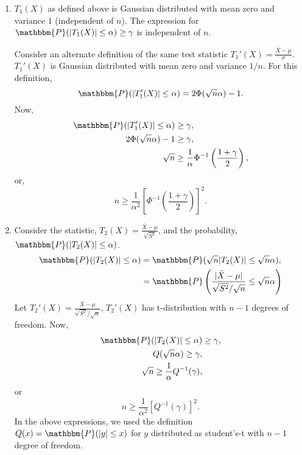 \documentclass[a4paper,english,12pt]{article}
\begin{document}
\begin{enumerate}[label=(\alph*).]
\item $T_1(X)$ as defined above is Gaussian distributed with mean zero and variance $1$ (independent of $n$). The expression for $\mathbbm{P}(|T_1(X)|\leq\alpha)\geq \gamma$ is independent of $n$. 
\par Consider an alternate definition of the same test statistic $T_1'(X)=\frac{\bar{X}-\mu}{\sigma}$. $T_1'(X)$ is Gaussian distributed with mean zero and variance $1/n$. For this definition,
\begin{equation*}
\mathbbm{P}(|T_1'(X)|\leq\alpha)=2\Phi(\sqrt{n}\alpha)-1.
\end{equation*}
Now,
\begin{align*}
\mathbbm{P}(|T_1'(X)|\leq\alpha)&\geq \gamma,\\
2\Phi(\sqrt{n}\alpha)-1&\geq \gamma,\\
\sqrt{n}&\geq \frac{1}{\alpha}\Phi^{-1}\left(\frac{1+\gamma}{2}\right),
\end{align*}
or,
\begin{equation*}
n\geq \frac{1}{\alpha^2}\left[\Phi^{-1}\left(\frac{1+\gamma}{2}\right)\right]^2.
\end{equation*}
\item Consider the statistic, $T_2(X)=\frac{\bar{X}-\mu}{\sqrt{S^2}}$, and the probability, $\mathbbm{P}(|T_2(X)|\leq\alpha)$.
\begin{align*}
\mathbbm{P}(|T_2(X)|\leq\alpha)&=\mathbbm{P}(\sqrt{n}|T_2(X)|\leq\sqrt{n}\alpha),\\
&=\mathbbm{P}\left(\frac{|\bar{X}-\mu|}{\sqrt{S^2}/\sqrt{n}}\leq\sqrt{n}\alpha\right)
\end{align*}
Let $T_2'(X)=\frac{\bar{X}-\mu}{\sqrt{S^2}/\sqrt{n}}$, $T_2'(X)$ has t-distribution with $n-1$ degrees of freedom. Now,
\begin{align*}
\mathbbm{P}(|T_2(X)|\leq\alpha)&\geq \gamma,\\
Q(\sqrt{n}\alpha)\geq \gamma,\\
\sqrt{n}\geq \frac{1}{\alpha}Q^{-1}(\gamma),
\end{align*}
or 
\begin{equation*}
n \geq \frac{1}{\alpha^2}\left[Q^{-1}(\gamma)\right]^2.
\end{equation*}
In the above expressions, we used the definition $Q(x)=\mathbbm{P}(|y|\leq x)$ for $y$ distributed as student's-t with $n-1$ degree of freedom.
\end{enumerate}
\end{document}
